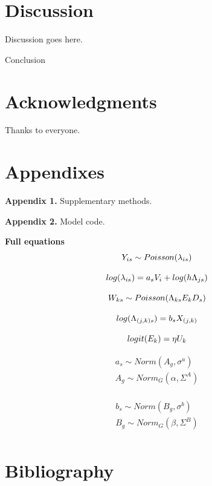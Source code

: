 \documentclass[preprint,review,times,12pt]{elsarticle}
\begin{document}
\section{Discussion}
\label{S:4}
Discussion goes here.

Conclusion



\section{Acknowledgments}
Thanks to everyone.



\section{Appendixes}
\textbf{Appendix 1.} Supplementary methods.  

\textbf{Appendix 2.} Model code.

\textbf{Full equations}  
\begin{equation}
Y_{is} \sim Poisson(\lambda_{is}) \\
\end{equation}

\begin{equation}
log(\lambda_{is}) = a_s V_i + log(h\Lambda_{js}) \\
\end{equation}

\begin{equation}
W_{ks} \sim Poisson(\Lambda_{ks}E_kD_s) \\
\end{equation}

\begin{equation}
log(\Lambda_{(j,k)s}) = b_s X_{(j,k)} \\
\end{equation}

\begin{equation}
logit(E_k) = \eta U_k \\
\end{equation}

\begin{equation}
\begin{gathered}
a_s \sim Norm(A_g, \sigma^a) \\
A_g \sim Norm_G(\alpha, \Sigma^A) \\
\end{gathered}
\end{equation}

\begin{equation}
\begin{gathered}
b_s \sim Norm(B_g, \sigma^b) \\
B_g \sim Norm_G(\beta, \Sigma^B) \\
\end{gathered}
\end{equation}



\section{Bibliography}

\end{document}
